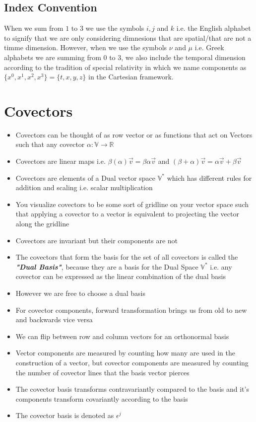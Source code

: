 \subsection{Index Convention}
When we sum from $1$ to $3$ we use the symbols $i,j$ and $k$ i.e. the English alphabet to signify that we are only considering dimnesions that are spatial/that are not a timme dimension. However, when we use the symbols $\nu$ and $\mu$ i.e. Greek alphabets we are summing from 0 to 3, we also include the temporal dimension according to the tradition of special relativity in which we name components as $\{x^{0}, x^{1}, x^{2}, x^{3}\} = \{t, x, y, z\}$ in the Cartesian framework.

\section{Covectors}
\begin{itemize}
	\item Covectors can be thought of as row vector or as functions that act on Vectors such that any covector $\alpha : \mathbb{V} \rightarrow \mathbb{R}$
	\item Covectors are linear maps i.e. $ \beta ( \alpha ) \vec{v} = \beta \alpha \vec{v}$ and $(\beta + \alpha ) \vec{v} = \alpha \vec{v} + \beta \vec{v}$
	\item Covectors are elements of a Dual vector space $\mathbb{V}^*$ which has different rules for addition and scaling i.e. scalar multiplication
	\item You visualize covectors to be some sort of gridline on your vector space such that applying a covector to a vector is equivalent to projecting the vector along the gridline
	\item Covectors are invariant but their components are not
	\item The covectors that form the basis for the set of all covectors is called the \textit{\textbf{"Dual Basis"}}, because they are a basis for the Dual Space $\mathbb{V}^*$ i.e. any covector can be expressed as the linear combination of the dual basis
	\item However we are free to choose a dual basis
	\item For covector components, forward transformation brings us from old to new and backwards vice versa
	\item We can flip between row and column vectors for an orthonormal basis
	\item Vector components are measured by counting how many are used in the construction of a vector, but covector components are measured by counting the number of covector lines that the basis vector pierces
	\item The covector basis transforms contravariantly compared to the basis and it's components transform covariantly according to the basis 
	\item The covector basis is denoted as $\epsilon^{j}$
\end{itemize}


